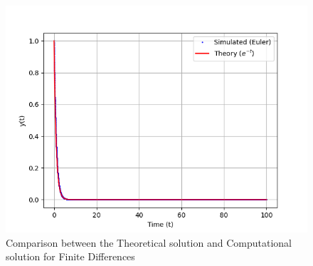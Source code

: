 \documentclass[journal]{IEEEtran}
\begin{document}
 \begin{figure}[H]
 \centering
   \includegraphics[width=1\linewidth]{../Problem 1/figs/fig.png}
   \caption{Comparison between the Theoretical solution and Computational solution for Finite Differences}
\end{figure}
\end{document}
